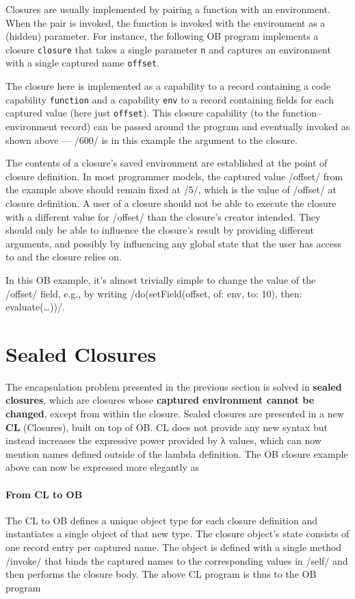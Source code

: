 \documentclass[main.tex]{subfiles}
\begin{document}
Closures are usually implemented by pairing a function with an environment. When the pair is invoked, the function is invoked with the environment as a (hidden) parameter. For instance, the following OB program implements a closure \texttt{closure} that takes a single parameter \texttt{n} and captures an environment with a single captured name \texttt{offset}.

The closure here is implemented as a capability to a record containing a code capability \texttt{function} and a capability \texttt{env} to a record containing fields for each captured value (here just \texttt{offset}). This closure capability (to the function–environment record) can be passed around the program and eventually invoked as shown above — \iil/600/ is in this example the argument to the closure.

The contents of a closure's saved environment are established at the point of closure definition. In most programmer models, the captured value \iil/offset/ from the example above should remain fixed at \iil/5/, which is the value of \iil/offset/ at closure definition. A user of a closure should not be able to execute the closure with a different value for \iil/offset/ than the closure's creator intended. They should only be able to influence the closure's result by providing different arguments, and possibly by influencing any global state that the user has access to and the closure relies on.

In this OB example, it's almost trivially simple to change the value of the \iil/offset/ field, e.g., by writing \iil/do(setField(offset, of: env, to: 10), then: evaluate(…))/.

\section{Sealed Closures} \label{sct:cls-sealed}
The encapsulation problem presented in the previous section is solved in \textbf{sealed closures}, which are closures whose \textbf{captured environment cannot be changed}, except from within the closure. Sealed closures are presented in a new  \textbf{CL} (Closures), built on top of OB. CL does not provide any new syntax but instead increases the expressive power provided by λ values, which can now mention names defined outside of the lambda definition. The OB closure example above can now be expressed more elegantly as

\paragraph{From CL to OB} The CL to OB  defines a unique object type for each closure definition and instantiates a single object of that new type. The closure object's state consists of one record entry per captured name. The object is defined with a single method \iil/invoke/ that binds the captured names to the corresponding values in \iil/self/ and then performs the closure body. The above CL program is thus \lowered{} to the OB program
\end{document}
